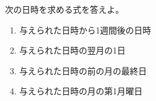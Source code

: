 \begin{Prob}\upshape\label{DateProb}
 次の日時を求める式を答えよ。
 \begin{enumerate}
	\item 与えられた日時から1週間後の日時
	\item 与えられた日時の翌月の1日
	\item 与えられた日時の前の月の最終日
	\item 与えられた日時の月の第1月曜日
 \end{enumerate}
\end{Prob}

